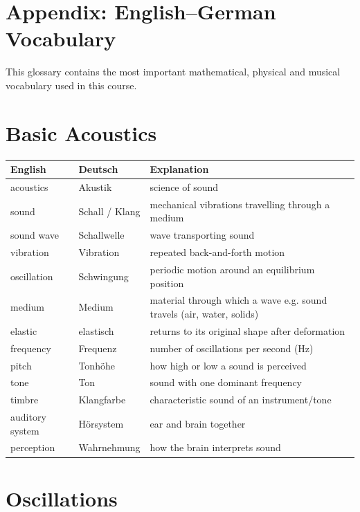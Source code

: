 \section{Appendix: English--German Vocabulary}


This glossary contains the most important mathematical, physical and musical vocabulary used in this course.

\section*{Basic Acoustics}

\begin{tabular}{p{}p{}p{}}
\textbf{English} & \textbf{Deutsch} & \textbf{Explanation} \\ \hline
acoustics & Akustik & science of sound \\
sound & Schall / Klang & mechanical vibrations travelling through a medium \\
sound wave & Schallwelle & wave transporting sound \\
vibration & Vibration & repeated back-and-forth motion \\
oscillation & Schwingung & periodic motion around an equilibrium position \\
medium & Medium & material through which a wave e.g. sound travels (air, water, solids) \\
elastic & elastisch & returns to its original shape after deformation \\
frequency & Frequenz & number of oscillations per second (Hz) \\
pitch & Tonhöhe & how high or low a sound is perceived \\
tone & Ton & sound with one dominant frequency \\
timbre & Klangfarbe & characteristic sound of an instrument/tone \\
auditory system & Hörsystem & ear and brain together \\
perception & Wahrnehmung & how the brain interprets sound \\
\end{tabular}

\vspace{0.7cm}

\section*{Oscillations}

